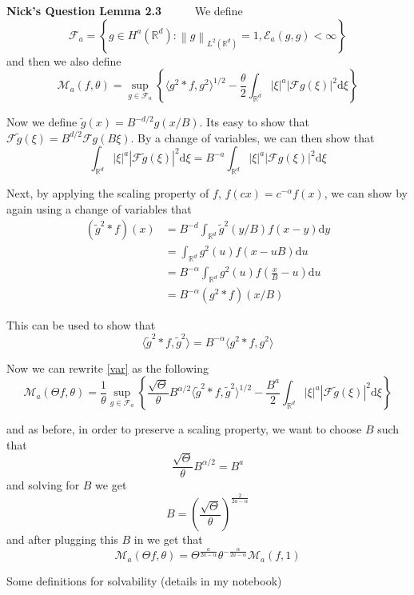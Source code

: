 \documentclass[a4paper,11pt]{article}
\numberwithin{equation}{section}
\theoremstyle{plain}
\theoremstyle{definition}
\newcommand{\ud}{\ensuremath{\mathrm{d} }}
\newcommand{\Norm}[1]{\left\|  #1   \right\|}
\newcommand{\R}{\mathbb{R}}
\newcounter{NQ}
\newenvironment{NickQuestion}[1][] %
{\refstepcounter{NQ}
	\begin{mdframed}[backgroundcolor=lightgray]\textbf{Nick's Question \theNQ \: #1~~}~~~\noindent}%
	{\end{mdframed}}
\numberwithin{NQ}{section}
\numberwithin{LQ}{section}
\numberwithin{ZQ}{section}
\begin{document}
	\begin{NickQuestion}[Lemma 2.3]
		We define
		\[
		\mathcal{F}_a = \left\{ g \in H^a(\R^d) : \Norm{g}_{L^2(\R^d)}=1, \mathcal{E}_a(g,g) < \infty \right\}
		\]
		and then we also define
		\begin{equation} \label{var}
		\mathcal{M}_a(f,\theta)= \sup_{g \in \mathcal{F}_a}\left\{ \langle g^2*f,g^2 \rangle^{1/2} - \frac{\theta}{2}\int_{\R^d}|\xi|^a|\mathcal{F}g(\xi)|^2 \ud \xi   \right\}
		\end{equation}

		Now we define $\tilde{g}(x)  = B^{-d/2}g(x/B)$. Its easy to show that $\mathcal{F}\tilde{g}(\xi) = B^{d/2}\mathcal{F}g(B\xi)$. By a change of variables, we can then show that
		\[
		\int_{\R^d}|\xi|^a|\mathcal{F}\tilde{g}(\xi)|^2 \ud \xi = B^{-a}\int_{\R^d}|\xi|^a|\mathcal{F}g(\xi)|^2 \ud \xi
		\]

		Next, by applying the scaling property of $f$, $f(cx) = c^{-\alpha}f(x)$, we can show by again using a change of variables that
		\begin{align*}
		(\tilde{g}^2*f)(x) &= B^{-d} \int_{\R^d} \tilde{g}^2(y/B)f(x-y)\ud y
		\\ & = \int_{\R^d} g^2(u)f(x-uB)\ud u
		\\& = B^{-\alpha} \int_{\R^d} g^2(u)f\left(\frac{x}{B}-u\right)\ud u
		\\&= B^{-\alpha}(g^2*f)(x/B)
		\end{align*}

		This can be used to show that
		\[
		\langle \tilde{g}^2*f, \tilde{g}^2  \rangle = 	B^{-\alpha}\langle g^2*f, g^2  \rangle
		\]

		Now we can rewrite \eqref{var} as the following
		\[
		\mathcal{M}_a(\Theta f,\theta)=\frac{1}{\theta} \sup_{g \in \mathcal{F}_a}\left\{ \frac{\sqrt{\Theta}}{\theta} B^{\alpha/2} \langle \tilde{g}^2*f,\tilde{g}^2 \rangle^{1/2} - \frac{B^a}{2}\int_{\R^d}|\xi|^a|\mathcal{F}\tilde{g}(\xi)|^2 \ud \xi   \right\}
		\]

		and as before, in order to preserve a scaling property, we want to choose $B$ such that
		\[
		\frac{\sqrt{\Theta}}{\theta} B^{\alpha/2} = B^a
		\]
		and solving for $B$ we get
		\[
		B= \left(\frac{\sqrt{\Theta}}{\theta}\right)^{\frac{2}{2a-\alpha}}
		\]
		and after plugging this $B$ in we get that
		\[
		\mathcal{M}_a(\Theta f,\theta) = \Theta^{\frac{a}{2a-\alpha}}\theta^{-\frac{\alpha}{2a-\alpha}} 	\mathcal{M}_a(f,1)
		\]
	\end{NickQuestion}

	Some definitions for solvability (details in my notebook)
\end{document}
